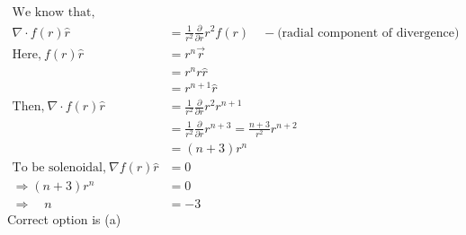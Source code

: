 \begin{enumerate}[label=\color{ocre}\textbf{\arabic*.}]
\begin{answer}
\begin{align*}
\text{We know that,}\\
\nabla \cdot f(r) \hat{r}&=\frac{1}{r^{2}} \frac{\partial}{\partial r} r^{2} f(r)\quad- \text{(radial component of divergence)}\\
\text{Here,}\ f(r) \hat{r}&=r^{n} \vec{r}\\
&=r^{n} r \hat{r}\\
&=r^{n+1} \hat{r}\\
\text{Then,}\ \nabla \cdot f(r) \hat{r}&=\frac{1}{r^{2}} \frac{\partial}{\partial r} r^{2} r^{n+1}\\
&=\frac{1}{r^{2}} \frac{\partial}{\partial r} r^{n+3}=\frac{n+3}{r^{2}} r^{n+2}\\
&=(n+3) r^{n}\\
\text{To be solenoidal,}\ \nabla f(r) \hat{r}&=0\\
\Rightarrow(n+3) r^{n}&=0\\
\Rightarrow \quad n&=-3
\end{align*}
Correct option is (a)
\end{answer}



\end{enumerate}
